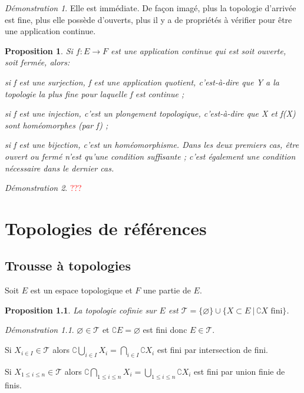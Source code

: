 \documentclass[a4paper, 11pt, french]{book}
\newenvironment{itemise}{\itemize}{\enditemize}
\theoremstyle{plain} %
\newtheorem{proposition}{Proposition}
\theoremstyle{definition} %
\theoremstyle{remark} %
\newtheorem*{demonstration}{Démonstration}
\newcommand{\1}{\mathds{1}}
\newcommand\vide{\varnothing}
\newcommand{\infegal}{\leqslant}
\newcommand\ens[2]{\{#1 \ |\ #2\}}
\begin{document}
\begin{demonstration}
	Elle est immédiate.
	De façon imagé, plus la topologie d'arrivée est fine, plus elle possède d'ouverts, plus il y a de propriétés à vérifier pour être une application continue.
\end{demonstration}

\begin{proposition}
	Si $f\colon E\rightarrow F$ est une application continue qui est soit ouverte, soit fermée, alors:
	\begin{itemise}
		\item si f est une surjection, f est une application quotient, c'est-à-dire que Y a la topologie la plus fine pour laquelle f est continue ;
		\item si f est une injection, c'est un plongement topologique, c'est-à-dire que X et f(X) sont homéomorphes (par f) ;
		\item si f est une bijection, c'est un homéomorphisme.
	\end{itemise}
	Dans les deux premiers cas, être ouvert ou fermé n'est qu'une condition suffisante ; c'est également une condition nécessaire dans le dernier cas.
\end{proposition}

\begin{demonstration}
	\textcolor{red}{???}
\end{demonstration}

\chapter{Topologies de références}

\section{Trousse à topologies}

Soit $E$ est un espace topologique et $F$ une partie de $E$.

\begin{proposition}
	La topologie cofinie sur $E$ est $\mathscr{T}=\{\vide\}\cup\ens{X\subset E}{\complement X\text{ fini}}$.
\end{proposition}

\begin{demonstration}
	\begin{itemise}
		\item $\vide\in\mathscr{T}$ et $\complement E=\vide$ est fini donc $E\in\mathscr{T}$.
		\item Si $X_{i\in I}\in\mathscr{T}$ alors $\complement\bigcup_{i\in I}X_i=\bigcap_{i\in I}\complement X_i$ est fini par intersection de fini.
		\item Si $X_{1\infegal i\infegal n}\in\mathscr{T}$ alors $\complement\bigcap_{1\infegal i\infegal n}X_i=\bigcup_{1\infegal i\infegal n}\complement X_i$ est fini par union finie de finis.
	\end{itemise}
\end{demonstration}
\end{document}
